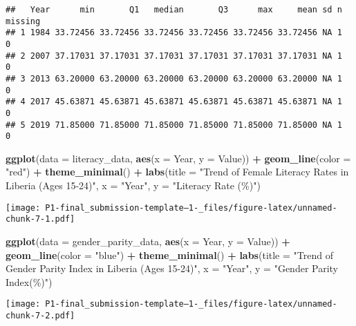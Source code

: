 \documentclass[
]{article}
\newenvironment{Shaded}{\begin{snugshade}}{\end{snugshade}}
\newcommand{\AttributeTok}[1]{\textcolor[rgb]{0.13,0.29,0.53}{#1}}
\newcommand{\FunctionTok}[1]{\textcolor[rgb]{0.13,0.29,0.53}{\textbf{#1}}}
\newcommand{\NormalTok}[1]{#1}
\newcommand{\SpecialCharTok}[1]{\textcolor[rgb]{0.81,0.36,0.00}{\textbf{#1}}}
\newcommand{\StringTok}[1]{\textcolor[rgb]{0.31,0.60,0.02}{#1}}
\begin{document}
\begin{verbatim}
##   Year      min       Q1   median       Q3      max     mean sd n missing
## 1 1984 33.72456 33.72456 33.72456 33.72456 33.72456 33.72456 NA 1       0
## 2 2007 37.17031 37.17031 37.17031 37.17031 37.17031 37.17031 NA 1       0
## 3 2013 63.20000 63.20000 63.20000 63.20000 63.20000 63.20000 NA 1       0
## 4 2017 45.63871 45.63871 45.63871 45.63871 45.63871 45.63871 NA 1       0
## 5 2019 71.85000 71.85000 71.85000 71.85000 71.85000 71.85000 NA 1       0
\end{verbatim}

\begin{Shaded}
\begin{Highlighting}[]
\FunctionTok{ggplot}\NormalTok{(}\AttributeTok{data =}\NormalTok{ literacy\_data, }\FunctionTok{aes}\NormalTok{(}\AttributeTok{x =}\NormalTok{ Year, }\AttributeTok{y =}\NormalTok{ Value)) }\SpecialCharTok{+}
    \FunctionTok{geom\_line}\NormalTok{(}\AttributeTok{color =} \StringTok{"red"}\NormalTok{) }\SpecialCharTok{+} 
    \FunctionTok{theme\_minimal}\NormalTok{() }\SpecialCharTok{+}
    \FunctionTok{labs}\NormalTok{(}\AttributeTok{title =} \StringTok{"Trend of Female Literacy Rates in Liberia (Ages 15{-}24)"}\NormalTok{, }\AttributeTok{x =} \StringTok{"Year"}\NormalTok{, }\AttributeTok{y =} \StringTok{"Literacy Rate (\%)"}\NormalTok{)}
\end{Highlighting}
\end{Shaded}

\texttt{[image: P1-final\_submission-template--1-\_files/figure-latex/unnamed-chunk-7-1.pdf]}

\begin{Shaded}
\begin{Highlighting}[]
\FunctionTok{ggplot}\NormalTok{(}\AttributeTok{data =}\NormalTok{ gender\_parity\_data, }\FunctionTok{aes}\NormalTok{(}\AttributeTok{x =}\NormalTok{ Year, }\AttributeTok{y =}\NormalTok{ Value)) }\SpecialCharTok{+}
    \FunctionTok{geom\_line}\NormalTok{(}\AttributeTok{color =} \StringTok{"blue"}\NormalTok{) }\SpecialCharTok{+} 
    \FunctionTok{theme\_minimal}\NormalTok{() }\SpecialCharTok{+}
    \FunctionTok{labs}\NormalTok{(}\AttributeTok{title =} \StringTok{"Trend of Gender Parity Index in Liberia (Ages 15{-}24)"}\NormalTok{, }\AttributeTok{x =} \StringTok{"Year"}\NormalTok{, }\AttributeTok{y =} \StringTok{"Gender Parity Index(\%)"}\NormalTok{)}
\end{Highlighting}
\end{Shaded}

\texttt{[image: P1-final\_submission-template--1-\_files/figure-latex/unnamed-chunk-7-2.pdf]}
\end{document}
